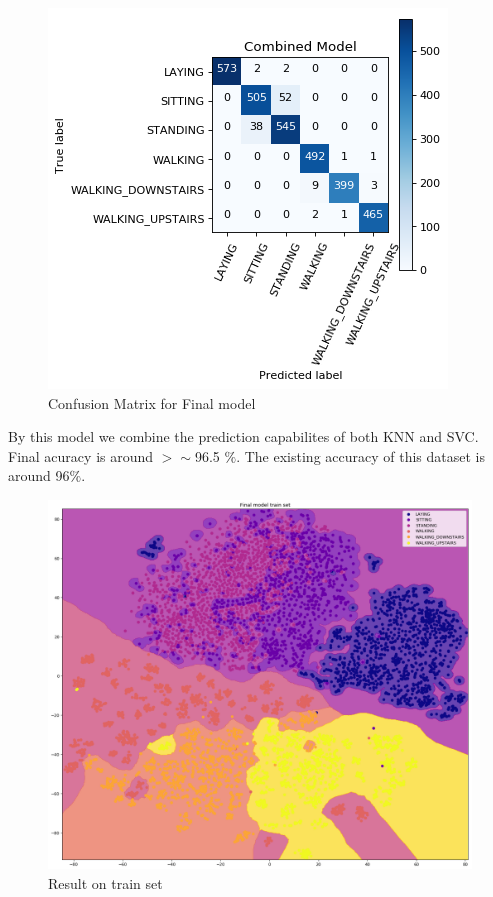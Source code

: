 \documentclass[12pt]{article}
\begin{document}
\begin{figure}[H]
	\centering
	\includegraphics[scale=0.450]{combo.png}
	\caption{Confusion Matrix for Final model}
\end{figure}
By this model we combine the prediction capabilites of both KNN and SVC. Final acuracy is around $>\sim$96.5 $\%$. The existing accuracy of this dataset is around 96$\%$.
\begin{figure}[H]
	\centering
	\includegraphics[scale=0.30]{result_train.png}
	\caption{Result on train set}
\end{figure}\noindent
\end{document}
